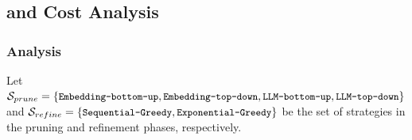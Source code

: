 

\subsection{ and Cost Analysis}
\label{subsec:analysis}

\subsubsection{ Analysis}
\label{subsubsec:correct} 
Let $\mathcal{S}_{prune} = \{\text{\texttt{\small Embedding-bottom-up}}, \\ \text{\texttt{\small Embedding-top-down}},  \text{\texttt{\small LLM-bottom-up}}, \text{\texttt{\small LLM-top-down}}\}$ and  $\mathcal{S}_{refine} = \\ \{\text{\texttt{\small Sequential-Greedy}},  \text{\texttt{\small Exponential-Greedy}}\}$ be the set of strategies in the pruning and refinement phases, respectively.  

